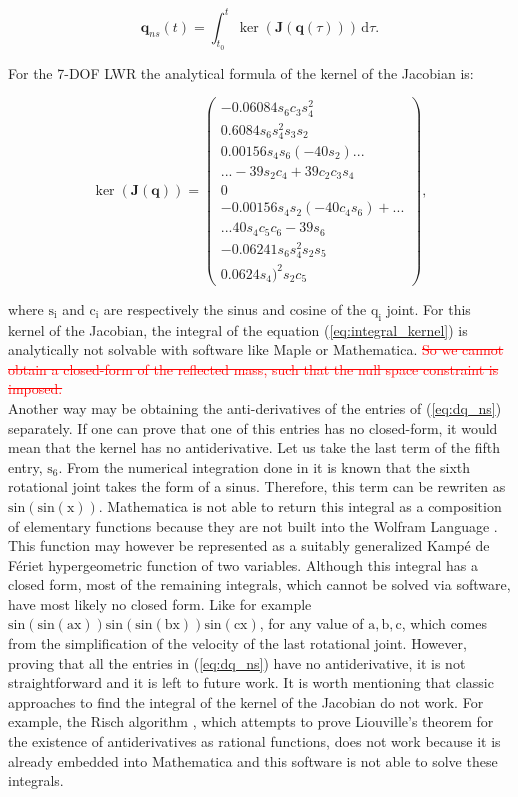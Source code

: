 \begin{equation}
\mathbf{q}_{ns}(t) = \int_{t_0}^t \! \ker(\mathbf{J}(\mathbf{q}(\tau))) \, \mathrm{d}\tau. 
\label{eq:integral_kernel}
\end{equation}

For the 7-DOF LWR the analytical formula of the kernel of the Jacobian is:

\begin{equation}
\ker(\mathbf{J}(\mathbf{q}))  =\begin{pmatrix} -0.06084s_6 c_3 s_4^2\\
0. 6084s_6 s_4^2 s_3 s_2\\
0.00156s_4 s_6 (-40s_2)...\\
...-39s_2 c_4 +39c_2 c_3 s_4\\
0\\
-0.00156s_4 s_2 (-40c_4 s_6)+...\\
...40s_4 c_5 c_6 -39s_6\\
-0.06241s_6 s_4^2 s_2 s_5\\
0.0624s_4)^2 s_2 c_5	
\end{pmatrix}	,
\label{eq:dq_ns}
\end{equation}


where $\mathrm{s_i}$ and $\mathrm{c_i}$ are respectively the sinus and cosine of the $\mathrm{q_i}$ joint. For this kernel of the Jacobian, the integral of the equation (\ref{eq:integral_kernel}) is analytically not solvable with software like Maple or Mathematica. \textcolor{red}{\st{ So we cannot obtain a closed-form of the reflected mass, such that the null space constraint is imposed.}}\\
Another way may be obtaining the anti-derivatives of the entries of (\ref{eq:dq_ns}) separately. If one can prove that one of this entries has no closed-form, it would mean that the kernel has no antiderivative. Let us take the last term of the fifth entry, $\mathrm{s_6}$. From the numerical integration done in  \cite{fabianthesis} it is known that the sixth rotational joint takes the form of a sinus. Therefore, this term can be rewriten as $\mathrm{\mathrm{sin(sin(x))}}$.  
Mathematica is not able to return this integral as a composition of elementary functions because they are not built into the Wolfram Language \cite{wolfram}. This function may however be represented as a suitably generalized Kampé de Fériet hypergeometric function \cite{kampe} of two variables. Although this integral has a closed form, most of the remaining integrals, which cannot be solved via software, have most likely no closed form. Like for example $\mathrm{sin(sin(ax))sin(sin(bx))sin(cx)}$, for any value of $\mathrm{a,b,c}$, which comes from the simplification of the velocity of the last rotational joint. However, proving that all the entries in (\ref{eq:dq_ns}) have no antiderivative, it is not straightforward and it is left to future work. It is worth mentioning that classic approaches to find the integral of the kernel of the Jacobian do not work. For example, the Risch algorithm \cite{risch}, which attempts to prove Liouville's theorem \cite{lioville} for the existence of antiderivatives as rational functions, does not work because it is already embedded into Mathematica and this software is not able to solve these integrals.
 
